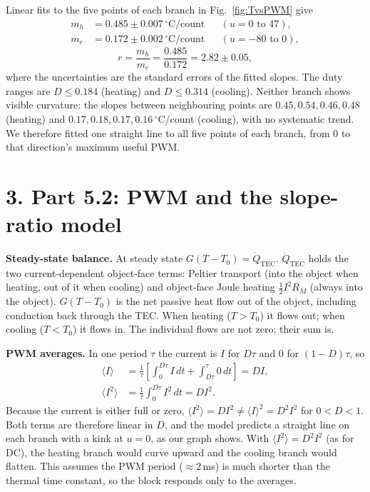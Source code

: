\documentclass[reprint, amsmath, amssymb, aps]{revtex4-2}
\newcommand{\Qdot}{\dot Q}
\newcommand{\degC}{\,^\circ\mathrm{C}}
\begin{document}
Linear fits to the five points of each branch in Fig.~\ref{fig:TvsPWM} give
\begin{align}
m_h &= 0.485 \pm 0.007\degC/\text{count} && (u = 0 \text{ to } 47),\\
m_c &= 0.172 \pm 0.002\degC/\text{count} && (u = -80 \text{ to } 0),
\end{align}
\begin{equation}
r = \frac{m_h}{m_c} = \frac{0.485}{0.172} = 2.82 \pm 0.05 ,
\end{equation}
where the uncertainties are the standard errors of the fitted slopes. The duty ranges are
$D \le 0.184$ (heating) and $D \le 0.314$ (cooling). Neither branch shows visible curvature:
the slopes between neighbouring points are $0.45, 0.54, 0.46, 0.48$ (heating) and $0.17, 0.18,
0.17, 0.16\degC$/count (cooling), with no systematic trend. We therefore fitted one straight
line to all five points of each branch, from $0$ to that direction's maximum useful PWM.

\section*{3. Part 5.2: PWM and the slope-ratio model}

\textbf{Steady-state balance.} At steady state $G(T-T_0) = \Qdot_{\mathrm{TEC}}$.
$\Qdot_{\mathrm{TEC}}$ holds the two current-dependent object-face terms: Peltier transport
(into the object when heating, out of it when cooling) and object-face Joule heating
$\tfrac12 I^2R_M$ (always into the object). $G(T-T_0)$ is the net passive heat flow out of the
object, including conduction back through the TEC. When heating ($T>T_0$) it flows out; when
cooling ($T<T_0$) it flows in. The individual flows are not zero; their sum is.

\textbf{PWM averages.} In one period $\tau$ the current is $I$ for $D\tau$ and $0$ for
$(1-D)\tau$, so
\begin{align}
\langle I\rangle &= \frac1\tau\left[\int_0^{D\tau}\! I\,dt + \int_{D\tau}^{\tau}\! 0\,dt\right]
 = DI,\\
\langle I^2\rangle &= \frac1\tau\int_0^{D\tau}\! I^2\,dt = DI^2 .
\end{align}
Because the current is either full or zero, $\langle I^2\rangle = DI^2 \neq \langle
I\rangle^2 = D^2I^2$ for $0<D<1$. Both terms are therefore linear in $D$, and the model
predicts a straight line on each branch with a kink at $u=0$, as our graph shows. With
$\langle I^2\rangle = D^2I^2$ (as for DC), the heating branch would curve upward and the
cooling branch would flatten. This assumes the PWM period ($\approx 2$\,ms) is much shorter
than the thermal time constant, so the block responds only to the averages.
\end{document}
